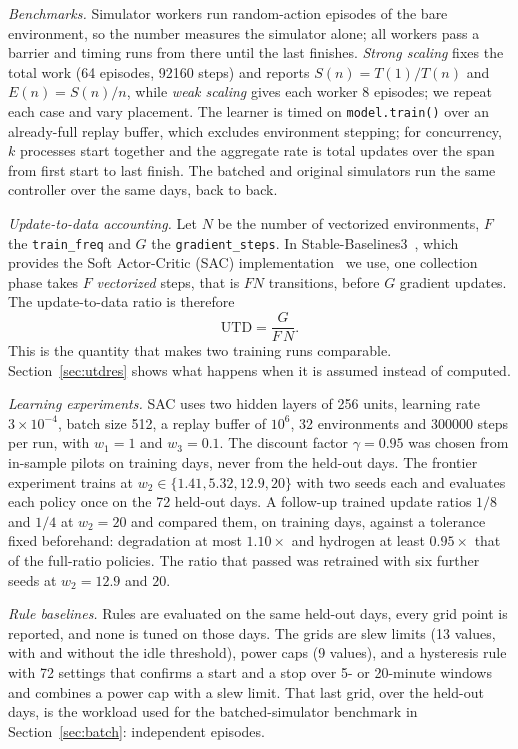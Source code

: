 \documentclass[conference]{IEEEtran}
\begin{document}
\emph{Benchmarks.} Simulator workers run random-action episodes of the bare environment, so the number measures
the simulator alone; all workers pass a barrier and timing runs from there until the last finishes. \emph{Strong
scaling} fixes the total work (64 episodes, \num{92160} steps) and reports $S(n)=T(1)/T(n)$ and $E(n)=S(n)/n$,
while \emph{weak scaling} gives each worker 8 episodes; we repeat each case and vary placement. The learner is
timed on \texttt{model.train()} over an already-full replay buffer, which excludes environment stepping; for
concurrency, $k$ processes start together and the aggregate rate is total updates over the span from first start
to last finish. The batched and original simulators run the same controller over the same days, back to back.

\emph{Update-to-data accounting.} Let $N$ be the number of vectorized environments, $F$ the \texttt{train\_freq}
and $G$ the \texttt{gradient\_steps}. In Stable-Baselines3~\cite{raffin2021sb3}, which provides the Soft
Actor-Critic (SAC) implementation~\cite{haarnoja2018sac,haarnoja2018sacapps} we use, one collection phase takes $F$
\emph{vectorized} steps, that is $FN$ transitions, before $G$ gradient updates. The update-to-data ratio is
therefore
\begin{equation}
\mathrm{UTD}=\frac{G}{F\,N}.
\label{eq:utd}
\end{equation}
This is the quantity that makes two training runs comparable. Section~\ref{sec:utdres} shows what happens when it
is assumed instead of computed.

\emph{Learning experiments.} SAC uses two hidden layers of 256 units, learning rate $3\times10^{-4}$, batch size
512, a replay buffer of $10^6$, 32 environments and \num{300000} steps per run, with $w_1=1$ and $w_3=0.1$. The
discount factor $\gamma=0.95$ was chosen from in-sample pilots on training days, never from the held-out days. The
frontier experiment trains at $w_2\in\{1.41,5.32,12.9,20\}$ with two seeds each and evaluates each policy once on
the 72 held-out days. A follow-up trained update ratios $1/8$ and $1/4$ at $w_2=20$ and compared them, on training
days, against a tolerance fixed beforehand: degradation at most $1.10\times$ and hydrogen at least $0.95\times$
that of the full-ratio policies. The ratio that passed was retrained with six further seeds at $w_2=12.9$ and $20$.

\emph{Rule baselines.} Rules are evaluated on the same held-out days, every grid point is reported, and none is
tuned on those days. The grids are slew limits (13 values, with and without the idle threshold), power caps (9
values), and a hysteresis rule with 72 settings that confirms a start and a stop over 5- or 20-minute windows and
combines a power cap with a slew limit. That last grid, over the held-out days, is the workload used for the
batched-simulator benchmark in Section~\ref{sec:batch}: \NumBatchGridEpisodes{} independent episodes.
\end{document}
